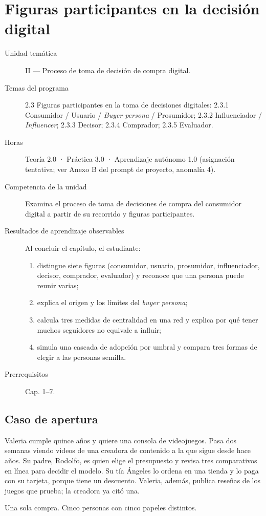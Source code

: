 \chapter{Figuras participantes en la decisión digital}
\label{cap:08}

\begin{cajaFicha}
\begin{description}
  \item[Unidad temática] II — Proceso de toma de decisión de compra digital.
  \item[Temas del programa] 2.3 Figuras participantes en la toma de decisiones digitales: 2.3.1 Consumidor / Usuario / \textit{Buyer persona} / Prosumidor; 2.3.2 Influenciador / \textit{Influencer}; 2.3.3 Decisor; 2.3.4 Comprador; 2.3.5 Evaluador.
  \item[Horas] Teoría 2.0 · Práctica 3.0 · Aprendizaje autónomo 1.0 (asignación tentativa; ver Anexo B del prompt de proyecto, anomalía 4).
  \item[Competencia de la unidad] Examina el proceso de toma de decisiones de compra del consumidor digital a partir de su recorrido y figuras participantes.
  \item[Resultados de aprendizaje observables] Al concluir el capítulo, el estudiante:
  \begin{enumerate}
    \item distingue siete figuras (consumidor, usuario, prosumidor, influenciador, decisor, comprador, evaluador) y reconoce que una persona puede reunir varias;
    \item explica el origen y los límites del \textit{buyer persona};
    \item calcula tres medidas de centralidad en una red y explica por qué tener muchos seguidores no equivale a influir;
    \item simula una cascada de adopción por umbral y compara tres formas de elegir a las personas semilla.
  \end{enumerate}
  \item[Prerrequisitos] Cap. 1--7.
\end{description}
\end{cajaFicha}

\section{Caso de apertura}

\begin{casoFicticio}
Valeria cumple quince años y quiere una consola de videojuegos. Pasa dos
semanas viendo videos de una creadora de contenido a la que sigue desde hace
años. Su padre, Rodolfo, es quien elige el presupuesto y revisa tres
comparativos en línea para decidir el modelo. Su tía Ángeles lo ordena en una
tienda y lo paga con su tarjeta, porque tiene un descuento. Valeria,
además, publica reseñas de los juegos que prueba; la creadora ya citó una.

Una sola compra. Cinco personas con cinco papeles distintos.
\end{casoFicticio}

